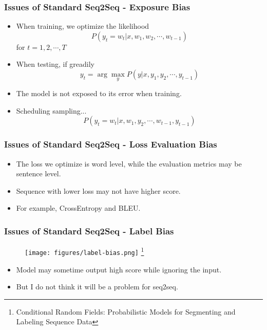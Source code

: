 \begin{frame}
  \frametitle{Issues of Standard Seq2Seq - Exposure Bias}
  \begin{itemize}
  \item When training, we optimize the likelihood
    $$P(y_t = w_t | x, w_1, w_2, \cdots, w_{t-1})$$
    for $t = 1, 2, \cdots, T$
  \item When testing, if greadily
    $$y_t = \arg \max_y P(y | x, y_1, y_2, \cdots, y_{t-1})$$
  \item The model is not exposed to its error when training.
  \item Scheduling sampling...
    $$P(y_t = w_t | x, w_1, y_2, \cdots, w_{t-1}, y_{t-1})$$
  \end{itemize}
\end{frame}


\begin{frame}
  \frametitle{Issues of Standard Seq2Seq - Loss Evaluation Bias}
  \begin{itemize}
  \item The loss we optimize is word level, while the evaluation metrics may be sentence level.
  \item Sequence with lower loss may not have higher score.
  \item For example, CrossEntropy and BLEU.
  \end{itemize}
\end{frame}


\begin{frame}
  \frametitle{Issues of Standard Seq2Seq - Label Bias}
  \begin{figure}
    \centering
    \texttt{[image: figures/label-bias.png]}
    \footnote{Conditional Random Fields: Probabilistic Models for Segmenting and Labeling Sequence Data}
  \end{figure}

  \begin{itemize}
  \item Model may sometime output high score while ignoring the input.
  \item But I do not think it will be a problem for seq2seq.
  \end{itemize}
\end{frame}
